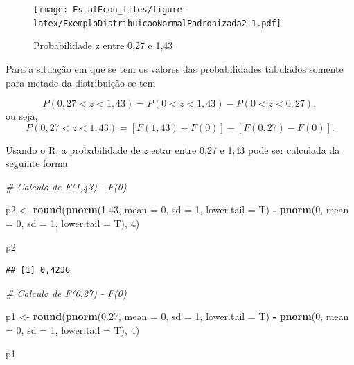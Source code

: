 \documentclass[
]{book}
\newenvironment{Shaded}{\begin{snugshade}}{\end{snugshade}}
\newcommand{\CommentTok}[1]{\textcolor[rgb]{0.56,0.35,0.01}{\textit{#1}}}
\newcommand{\DataTypeTok}[1]{\textcolor[rgb]{0.13,0.29,0.53}{#1}}
\newcommand{\DecValTok}[1]{\textcolor[rgb]{0.00,0.00,0.81}{#1}}
\newcommand{\FloatTok}[1]{\textcolor[rgb]{0.00,0.00,0.81}{#1}}
\newcommand{\KeywordTok}[1]{\textcolor[rgb]{0.13,0.29,0.53}{\textbf{#1}}}
\newcommand{\NormalTok}[1]{#1}
\newcommand{\OperatorTok}[1]{\textcolor[rgb]{0.81,0.36,0.00}{\textbf{#1}}}
\newcommand{\StringTok}[1]{\textcolor[rgb]{0.31,0.60,0.02}{#1}}
\begin{document}
\begin{figure}
\centering
\texttt{[image: EstatEcon\_files/figure-latex/ExemploDistribuicaoNormalPadronizada2-1.pdf]}
\caption{\label{fig:ExemploDistribuicaoNormalPadronizada2}Probabilidade z entre 0,27 e 1,43}
\end{figure}

Para a situação em que se tem os valores das probabilidades tabulados somente para metade da distribuição se tem

\[
  P(0,27 < z < 1,43) = P(0 < z < 1,43) - P(0 < z < 0,27),
\]
ou seja,
\[
  P(0,27 < z < 1,43) = [F(1,43) - F(0)] - [F(0,27) - F(0)].
\]

Usando o R, a probabilidade de \(z\) estar entre 0,27 e 1,43 pode ser calculada da seguinte forma

\begin{Shaded}
\begin{Highlighting}[]
\CommentTok{# Calculo de F(1,43) - F(0)}

\NormalTok{p2 <-}\StringTok{ }\KeywordTok{round}\NormalTok{(}\KeywordTok{pnorm}\NormalTok{(}\FloatTok{1.43}\NormalTok{, }\DataTypeTok{mean =} \DecValTok{0}\NormalTok{, }\DataTypeTok{sd =} \DecValTok{1}\NormalTok{, }\DataTypeTok{lower.tail =}\NormalTok{ T) }\OperatorTok{-}\StringTok{ }
\StringTok{    }\KeywordTok{pnorm}\NormalTok{(}\DecValTok{0}\NormalTok{, }\DataTypeTok{mean =} \DecValTok{0}\NormalTok{, }\DataTypeTok{sd =} \DecValTok{1}\NormalTok{, }\DataTypeTok{lower.tail =}\NormalTok{ T), }\DecValTok{4}\NormalTok{)}

\NormalTok{p2}
\end{Highlighting}
\end{Shaded}

\begin{verbatim}
## [1] 0,4236
\end{verbatim}

\begin{Shaded}
\begin{Highlighting}[]
\CommentTok{# Calculo de F(0,27) - F(0)}

\NormalTok{p1 <-}\StringTok{ }\KeywordTok{round}\NormalTok{(}\KeywordTok{pnorm}\NormalTok{(}\FloatTok{0.27}\NormalTok{, }\DataTypeTok{mean =} \DecValTok{0}\NormalTok{, }\DataTypeTok{sd =} \DecValTok{1}\NormalTok{, }\DataTypeTok{lower.tail =}\NormalTok{ T) }\OperatorTok{-}\StringTok{ }
\StringTok{    }\KeywordTok{pnorm}\NormalTok{(}\DecValTok{0}\NormalTok{, }\DataTypeTok{mean =} \DecValTok{0}\NormalTok{, }\DataTypeTok{sd =} \DecValTok{1}\NormalTok{, }\DataTypeTok{lower.tail =}\NormalTok{ T), }\DecValTok{4}\NormalTok{)}

\NormalTok{p1}
\end{Highlighting}
\end{Shaded}
\end{document}

